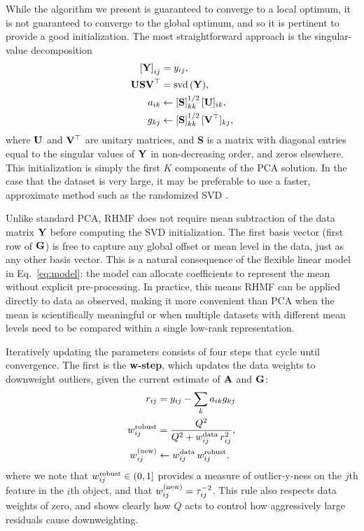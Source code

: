 \documentclass[onecolumn,floatfix,linenumbers,trackchanges]{aastex631}
\DeclareMathOperator{\svd}{svd}
\begin{document}
While the algorithm we present is guaranteed to converge to a local optimum, it is not guaranteed to converge to the global optimum, and so it is pertinent to provide a good initialization.
The most straightforward approach is the singular-value decomposition
\begin{align}
    \left[{\bf Y}\right]_{ij} &= y_{ij}, \\
    {\bf U} {\bf S} {\bf V}^\top &= \svd{\left({\bf Y}\right)}, \\
    a_{ik} &\leftarrow \left[{\bf S}\right]_{kk}^{1/2} [{\bf U}]_{ik}, \\
    g_{kj} &\leftarrow \left[{\bf S}\right]_{kk}^{1/2} [{\bf V}^\top]_{kj},
\end{align}
where ${\bf U}$ and ${\bf V}^\top$ are unitary matrices, and {\bf S} is a matrix with diagonal entries equal to the singular values of ${\bf Y}$ in non-decreasing order, and zeros elsewhere.
This initialization is simply the first $K$ components of the PCA solution.
In the case that the dataset is very large, it may be preferable to use a faster, approximate method such as the randomized SVD \citep{halko2011}.

Unlike standard PCA, RHMF does not require mean subtraction of the data matrix ${\bf Y}$ before computing the SVD initialization. The first basis vector (first row of ${\bf G}$) is free to capture any global offset or mean level in the data, just as any other basis vector. This is a natural consequence of the flexible linear model in Eq.~\eqref{eq:model}: the model can allocate coefficients to represent the mean without explicit pre-processing. In practice, this means RHMF can be applied directly to data as observed, making it more convenient than PCA when the mean is scientifically meaningful or when multiple datasets with different mean levels need to be compared within a single low-rank representation.

Iteratively updating the parameters consists of four steps that cycle until convergence. The first is the \textbf{w-step}, which  updates the data weights to downweight outliers, given the current estimate of ${\bf A}$ and ${\bf G}$:
\begin{align}
    r_{ij} &= {y_{ij} - \sum_k a_{ik} g_{kj}}\\
    w^{\rm robust}_{ij} & = \frac{Q^2}{Q^2 + {w_{ij}^{\rm data}}\,r_{ij}^2}, \label{eq:w_robust} \\
    w^{\rm (new)}_{ij} &\leftarrow w^{\rm data}_{ij}\, w^{\rm robust}_{ij},
\end{align}
where we note that $w^{\rm robust}_{ij} \in (0, 1]$ provides a measure of outlier-y-ness on the $j$th feature in the $i$th object, and that $w_{ij}^{\rm (new)} = \tau_{ij}^{-2}$.
This rule also respects data weights of zero, and shows clearly how $Q$ acts to control how aggressively large residuals cause downweighting.
\end{document}
